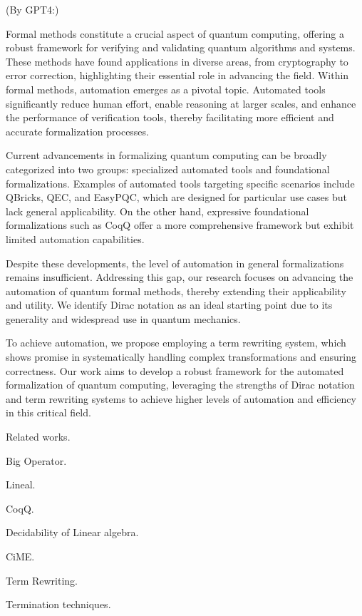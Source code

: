 \documentclass[manuscript, review, timestamp]{acmart}
\begin{document}
(By GPT4:)

Formal methods constitute a crucial aspect of quantum computing, offering a robust framework for verifying and validating quantum algorithms and systems. These methods have found applications in diverse areas, from cryptography to error correction, highlighting their essential role in advancing the field. Within formal methods, automation emerges as a pivotal topic. Automated tools significantly reduce human effort, enable reasoning at larger scales, and enhance the performance of verification tools, thereby facilitating more efficient and accurate formalization processes.

Current advancements in formalizing quantum computing can be broadly categorized into two groups: specialized automated tools and foundational formalizations. Examples of automated tools targeting specific scenarios include QBricks, QEC, and EasyPQC, which are designed for particular use cases but lack general applicability. On the other hand, expressive foundational formalizations such as CoqQ offer a more comprehensive framework but exhibit limited automation capabilities.

Despite these developments, the level of automation in general formalizations remains insufficient. Addressing this gap, our research focuses on advancing the automation of quantum formal methods, thereby extending their applicability and utility. We identify Dirac notation as an ideal starting point due to its generality and widespread use in quantum mechanics.

To achieve automation, we propose employing a term rewriting system, which shows promise in systematically handling complex transformations and ensuring correctness. Our work aims to develop a robust framework for the automated formalization of quantum computing, leveraging the strengths of Dirac notation and term rewriting systems to achieve higher levels of automation and efficiency in this critical field.


Related works.

Big Operator.\cite{Bertot2008}

Lineal.\cite{Arrighi2017}

CoqQ.\cite{Zhou2022}

Decidability of Linear algebra.\cite{Solovay2012}

CiME.\cite{Contejean2011}

Term Rewriting. \cite{Baader1998}

Termination techniques. \cite{Arts2000} \cite{Giesl2002} \cite{Giesl2006}
\end{document}
